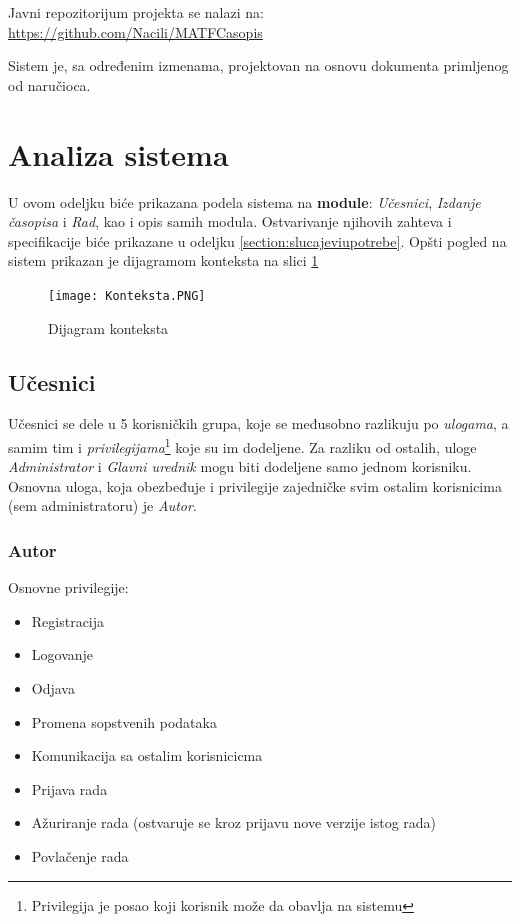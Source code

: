 \documentclass[a4paper]{article}
\begin{document}
Javni repozitorijum projekta se nalazi na: \url{https://github.com/Nacili/MATFCasopis}

Sistem je, sa određenim izmenama, projektovan na osnovu dokumenta \cite{ecas} primljenog od naručioca.

\newpage

\section{Analiza sistema}
\label{section:analiza}

U ovom odeljku biće prikazana podela sistema na \textbf{module}: \textit{Učesnici}, \textit{Izdanje časopisa} i \textit{Rad}, kao i opis samih modula. Ostvarivanje njihovih zahteva i specifikacije biće prikazane u odeljku \ref{section:slucajeviupotrebe}. Opšti pogled na sistem prikazan je dijagramom konteksta na slici \ref{fig:konteksta}
\begin{figure}[hbt!]
    \begin{center}
    \texttt{[image: Konteksta.PNG]}
    \end{center}
    \caption{Dijagram konteksta \cite{smalkov} \cite{vparadigm}}
    \label{fig:konteksta}
\end{figure}

\subsection{Učesnici}
\label{subsection:ucesnici}
    
    Učesnici se dele u 5 korisničkih grupa, koje se međusobno razlikuju po \textit{ulogama}, a samim tim i \textit{privilegijama}\footnote{ Privilegija je posao koji korisnik može da obavlja na sistemu} koje su im dodeljene. Za razliku od ostalih, uloge \textit{Administrator} i \textit{Glavni urednik} mogu biti dodeljene samo jednom korisniku. Osnovna uloga, koja obezbeđuje i privilegije zajedničke svim ostalim korisnicima (sem administratoru) je \textit{Autor}.
    
   \subsubsection{Autor}
   \label{subsubsection:autor}
    Osnovne privilegije:
    \begin{itemize}
        \item Registracija
        \item Logovanje
        \item Odjava
        \item Promena sopstvenih podataka
        \item Komunikacija sa ostalim korisnicicma
        \item Prijava rada
        \item Ažuriranje rada (ostvaruje se kroz prijavu nove verzije istog rada)
        \item Povlačenje rada
    \end{itemize}
    
\end{document}
